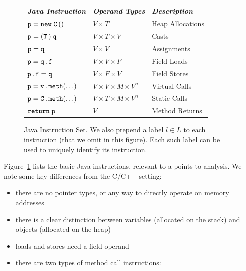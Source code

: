 \begin{figure}[t]
  \centering
  \begin{tabular}{l@{\quad}l@{\qquad}l}
    \toprule
    \emph{Java Instruction}
    & \emph{Operand Types}
    & \emph{Description} \\
    \midrule
    \(\newinstr{p}{C}\)
    & \(V \!\times\! T\)
    & Heap Allocations
    \\
    \(\castinstr{p}{T}{q}\)
    & \(V \!\times\! T \!\times\! V\)
    & Casts
    \\
    \(\moveinstr{p}{q}\)
    & \(V \!\times\! V\)
    & Assignments
    \\
    \(\fldloadinstr{p}{q}{f}\)
    & \(V \!\times\! V \!\times\! F\)
    & Field Loads
    \\
    \(\fldstoreinstr{p}{f}{q}\)
    & \(V \!\times\! F \!\times\! V\)
    & Field Stores
    \\
    \(\vcallinstr{p}{v}{meth}\)
    & \(V \!\times\! V \!\times\! M \!\times\! V^n\)
    & Virtual Calls
    \\
    \(\scallinstr{p}{C}{meth}\)
    & \(V \!\times\! T \!\times\! M \!\times\! V^n\)
    & Static Calls
    \\
    \(\returninstr{p}\)
    & \(V\)
    & Method Returns
    \\
    \bottomrule
  \end{tabular}
  \caption[Java Instruction Set]{%
    Java Instruction Set. We also prepend a label $l \in L$ to each
    instruction (that we omit in this figure). Each such label can be
    used to uniquely identify its instruction. %
  }
  \label{structsens/fig/javair}
\end{figure}

Figure~\ref{structsens/fig/javair} lists the basic Java instructions,
relevant to a points-to analysis. We note some key differences from
the C/C++ setting:
\begin{itemize}[--]
\setlength\itemsep{0.3em}
\item there are no pointer types, or any way to directly operate on
  memory addresses
\item there is a clear distinction between variables (allocated on the
  stack) and objects (allocated on the heap)
\item loads and stores need a field operand
\item there are two types of method call instructions:
\end{itemize}

